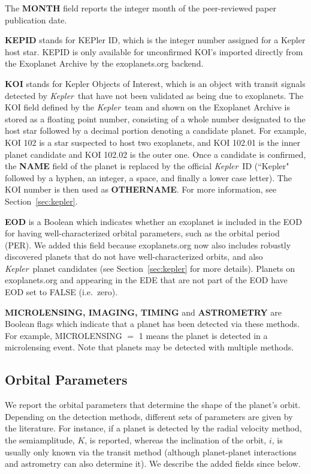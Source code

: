 \documentclass[11pt,preprint]{aastex}
\def\kepler{\textit{Kepler}}
\begin{document}
\begin{CJK*}{UTF8}{gbsn}
The {\bf MONTH} field reports the integer month of the
peer-reviewed paper publication date.

{\bf KEPID} stands for KEPler ID, which is the integer number assigned
for a Kepler host star. KEPID is only available for unconfirmed
KOI's imported directly from the Exoplanet Archive by the
exoplanets.org backend. 

{\bf KOI} stands for Kepler Objects of Interest, which is an object
with transit signals detected by \kepler\ that have not been validated
as being due to exoplanets.  The KOI field defined by the \kepler\
team and shown on the Exoplanet Archive is stored as a floating point
number, consisting of a whole number designated to the host star
followed by a decimal portion denoting a candidate planet. For example,
KOI 102 is a star suspected to host two exoplanets, and KOI 102.01 is
the inner planet candidate and KOI 102.02 is the outer one. Once a
candidate is confirmed, the {\bf NAME} field of the planet is replaced by
the official \kepler\ ID (``Kepler" followed by a hyphen, an integer,
a space, and finally a lower case letter). The KOI number is then used as
{\bf OTHERNAME}. For more information, see
Section~\ref{sec:kepler}.

{\bf EOD} is a Boolean which indicates whether an exoplanet is included
in the EOD for having well-characterized orbital
parameters, such as the orbital period (PER). We added this field because exoplanets.org
now also includes robustly discovered planets that do not have
well-characterized orbits, and also \kepler\ planet candidates (see
Section~\ref{sec:kepler} for more details).  Planets on exoplanets.org
and appearing in the EDE that are not part of the EOD have EOD set to
FALSE (i.e.\ zero).

{\bf MICROLENSING, IMAGING, TIMING} and {\bf ASTROMETRY} are Boolean flags which
indicate that a planet has been detected via these methods. For example,
MICROLENSING $=$ 1 means the planet is detected in a microlensing
event. Note that planets may be detected with multiple methods. 


\subsection{Orbital Parameters}\label{sec:orbit}

We report the orbital parameters that determine the shape of the
planet's orbit. Depending on the detection methods, different sets of
parameters are given by the literature. For instance, if a planet is
detected by the radial velocity method, the semiamplitude, $K$, is
reported, whereas the inclination of the orbit, $i$, is usually only
known via the transit method (although planet-planet interactions and
astrometry can also determine it). We describe the added fields since
\cite{Wright2011} below.


\end{CJK*}
\end{document}

